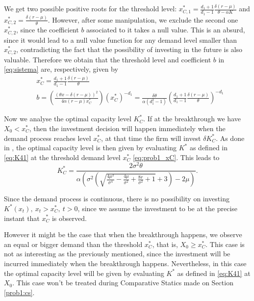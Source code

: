 We get two possible positive roots for the threshold level: $x^*_{C,1}=\frac{d_1+1}{d_1-1} \frac{ \delta (r-\mu)}{\theta-\alpha K}$ and $x^*_{C,2}=\frac{\delta  (r-\mu )}{\theta }$. However, after some manipulation, we exclude the second one $x^*_{C,2}$, since the coefficient $b$ associated to it takes a null value. This is an absurd, since it would lead to a null value function for any demand level smaller than $x^*_{C,2}$, contradicting the fact that the possibility of investing in the future is also valuable. Therefore we obtain that the threshold level and coefficient $b$ in \eqref{eq:sistema} are, respectively, given by
\begin{align}
 &x_C^*=\frac{d_1+1}{d_1-1} \frac{ \delta (r-\mu)}{\theta} \label{eq:prob1_xC}\\
 &b=\left( \frac{(\theta x -\delta (r-\mu))^2}{4 \alpha (r-\mu) x_C^*} \right)(x_C^*)^{-d_1} = \frac{\delta \theta}{\alpha (d_1^2-1)} \left( \frac{d_1+1}{d_1-1} \frac{ \delta (r-\mu)}{\theta} \right)^{-d_1} \nonumber
\end{align}

Now we analyse the optimal capacity level $K^*_C$. If at the breakthrough we have $X_0<x^*_C$, then the investment decision will happen immediately when the demand process reaches level $x^*_C$, at that time the firm will invest $\delta K^*_C$. 
As done in \cite{huis:cap}, the optimal capacity level is then given by evaluating $K^*$ as defined in \eqref{eq:K41} at the threshold demand level $x^*_C$ \eqref{eq:prob1_xC}. This leads to
\begin{equation}
K^*_C=\frac{2 \sigma ^2 \theta}{\alpha \left(\sigma ^2 \left(\sqrt{\frac{4 \mu ^2}{\sigma ^4}-\frac{4 \mu }{\sigma ^2}+\frac{8 r}{\sigma ^2}+1}+3\right)-2 \mu \right)}.
\label{prob1:K*}
\end{equation}

Since the demand process is continuous, there is no possibility on investing $K^*(x_t), \ x_t>x_C^*, \ t>0$, since we assume the investment to be at the precise instant that $x^*_C$ is observed.

However it might be the case that when the breakthrough happens, we observe an equal or bigger demand than the threshold $x^*_C$, that is, $X_0\geq x^*_C$. This case is not as interesting as the previously mentioned, since the investment will be incurred immediately when the breakthrough happens. Nevertheless, in this case the optimal capacity level will be given by evaluating $K^*$ as defined in \eqref{eq:K41} at $X_0$. This case won't be treated during Comparative Statics made on Section \ref{prob1:cs}.



